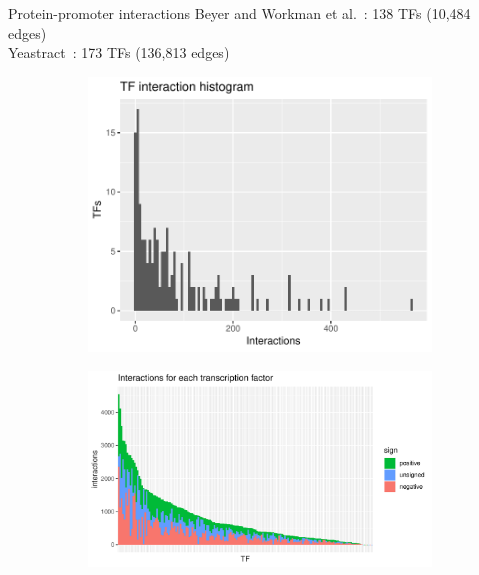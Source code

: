 \begin{frame}{Protein-promoter interactions}
Beyer and Workman et al.~\cite{BeyerWorkman2006}: 138 TFs (10,484 edges) \\
Yeastract~\cite{yeastract2017}: 173 TFs (136,813 edges)
\begin{figure}[ht]
  \centering
  \begin{subfigure}[t]{0.38\textwidth}
  \centering
  \caption{}
  \includegraphics[width=\textwidth]{data/fig/TF_interaction_hist.pdf}
  \label{fig:TF_interactions_hist}
  \end{subfigure}
  \hfill
  \begin{subfigure}[t]{0.5\textwidth}
  \centering
  \caption{}
  \includegraphics[width=\textwidth]{data/fig/yeastract.pdf}

\end{subfigure}
\end{figure}
\end{frame}
